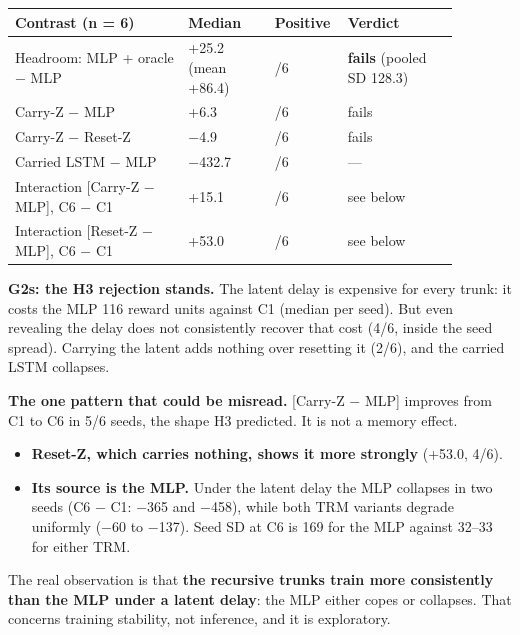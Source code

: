 \documentclass[11pt]{article}
\begin{document}
\begin{center}\small\begin{tabular}{>{\raggedright\arraybackslash}p{0.367\linewidth}>{\raggedleft\arraybackslash}p{0.184\linewidth}>{\raggedleft\arraybackslash}p{0.092\linewidth}>{\raggedright\arraybackslash}p{0.235\linewidth}}
\toprule
Contrast (n = 6) & Median & Positive & Verdict \\
\midrule
Headroom: MLP + oracle $-$ MLP & +25.2 (mean +86.4) & 4/6 & \textbf{fails} (pooled SD 128.3) \\
Carry-Z $-$ MLP & +6.3 & 3/6 & fails \\
Carry-Z $-$ Reset-Z & $-$4.9 & 2/6 & fails \\
Carried LSTM $-$ MLP & $-$432.7 & 0/6 & --- \\
Interaction [Carry-Z $-$ MLP], C6 $-$ C1 & +15.1 & 5/6 & see below \\
Interaction [Reset-Z $-$ MLP], C6 $-$ C1 & +53.0 & 4/6 & see below \\
\bottomrule
\end{tabular}\end{center}



\textbf{G2s: the H3 rejection stands.} The latent delay is expensive for every trunk: it costs the MLP 116 reward units against C1 (median per seed). But even revealing the delay does not consistently recover that cost (4/6, inside the seed spread). Carrying the latent adds nothing over resetting it (2/6), and the carried LSTM collapses.



\textbf{The one pattern that could be misread.} [Carry-Z $-$ MLP] improves from C1 to C6 in 5/6 seeds, the shape H3 predicted. It is not a memory effect.

\begin{itemize}
\item \textbf{Reset-Z, which carries nothing, shows it more strongly} (+53.0, 4/6).
\item \textbf{Its source is the MLP.} Under the latent delay the MLP collapses in two seeds (C6 $-$ C1: $-$365 and $-$458), while both TRM variants degrade uniformly ($-$60 to $-$137). Seed SD at C6 is 169 for the MLP against 32--33 for either TRM.
\end{itemize}



The real observation is that \textbf{the recursive trunks train more consistently than the MLP under a latent delay}: the MLP either copes or collapses. That concerns training stability, not inference, and it is exploratory.
\end{document}
